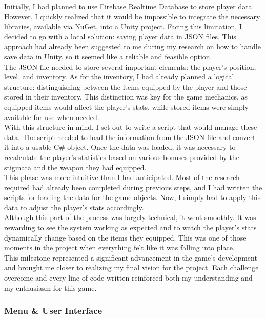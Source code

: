 \documentclass{article}
\begin{document}
Initially, I had planned to use Firebase Realtime Database to store player data. However, I quickly realized that it would be impossible to integrate the necessary libraries, available via NuGet, into a Unity project. Facing this limitation, I decided to go with a local solution: saving player data in JSON files. This approach had already been suggested to me during my research on how to handle save data in Unity, so it seemed like a reliable and feasible option.\\

The JSON file needed to store several important elements: the player’s position, level, and inventory. As for the inventory, I had already planned a logical structure: distinguishing between the items equipped by the player and those stored in their inventory. This distinction was key for the game mechanics, as equipped items would affect the player’s stats, while stored items were simply available for use when needed.\\

With this structure in mind, I set out to write a script that would manage these data. The script needed to load the information from the JSON file and convert it into a usable C\# object. Once the data was loaded, it was necessary to recalculate the player’s statistics based on various bonuses provided by the stigmata and the weapon they had equipped.\\

This phase was more intuitive than I had anticipated. Most of the research required had already been completed during previous steps, and I had written the scripts for loading the data for the game objects. Now, I simply had to apply this data to adjust the player’s stats accordingly.\\

Although this part of the process was largely technical, it went smoothly. It was rewarding to see the system working as expected and to watch the player’s stats dynamically change based on the items they equipped. This was one of those moments in the project when everything felt like it was falling into place.\\

This milestone represented a significant advancement in the game’s development and brought me closer to realizing my final vision for the project. Each challenge overcome and every line of code written reinforced both my understanding and my enthusiasm for this game.


\subsubsection{Menu \& User Interface}\hfill
\end{document}
